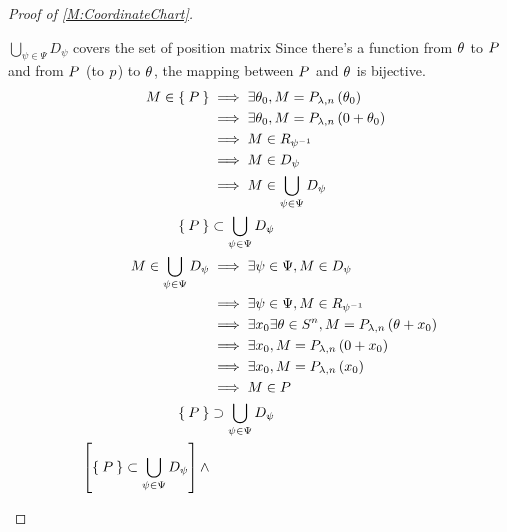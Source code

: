 \documentclass[../methodology.tex]{subfiles}
\begin{document}
\begin{proof}[Proof of \cref{M:CoordinateChart}]
    \begin{subproof}{\(\bigcup_{\psi\in\Psi} D_\psi\) covers the set of position matrix}
        Since there's a function from \(\tensor{\theta}{}\) to \(\tensor{P}{}\)
        and from \(\tensor{P}{}\) (to \(\tensor{p}{}\)) to \(\tensor{\theta}{}\),
        the mapping between \(\tensor{P}{}\) and \(\tensor{\theta}{}\) is bijective.
        \begin{align*}
            M\in \Set{P}
                    & \implies\exists\theta_0, M=P_{\lambda,n}\left(\theta_0\right)                   \\
                    & \implies\exists\theta_0, M=P_{\lambda,n}\left(0 +\theta_0\right)                \\
                    & \implies M\in R_{\psi^{-1}}                                                     \\
                    & \implies M\in D_{\psi}                                                          \\
                    & \implies M\in\bigcup_{\psi\in\Psi} D_\psi                                       \\
            \Set{P} & \subset\bigcup_{\psi\in\Psi}D_\psi                                              \\
            M\in\bigcup_{\psi\in\Psi} D_\psi
                    & \implies\exists\psi\in\Psi, M\in D_\psi                                         \\
                    & \implies\exists\psi\in\Psi, M\in R_{\psi^{-1}}                                  \\
                    & \implies\exists x_0\exists\theta\in S^n, M=P_{\lambda,n}\left(\theta+x_0\right) \\
                    & \implies\exists x_0, M=P_{\lambda,n}\left(0+x_0\right)                          \\
                    & \implies\exists x_0, M=P_{\lambda,n}\left(x_0\right)                            \\
                    & \implies M\in P                                                                 \\
            \Set{P} & \supset \bigcup_{\psi\in\Psi}D_\psi                                             \\
            \left[
                \Set{P} \subset \bigcup_{\psi\in\Psi}D_\psi
                \right]
            \wedge

\end{align*}
\end{subproof}
\end{proof}
\end{document}
